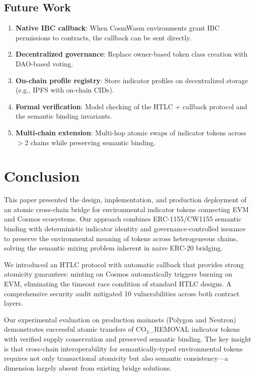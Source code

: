 \documentclass[conference,10pt]{IEEEtran}
\begin{document}
\subsection{Future Work}

\begin{enumerate}
    \item \textbf{Native IBC callback}: When CosmWasm environments grant IBC permissions to contracts, the callback can be sent directly.
    \item \textbf{Decentralized governance}: Replace owner-based token class creation with DAO-based voting.
    \item \textbf{On-chain profile registry}: Store indicator profiles on decentralized storage (e.g., IPFS with on-chain CIDs).
    \item \textbf{Formal verification}: Model checking of the HTLC + callback protocol and the semantic binding invariants.
    \item \textbf{Multi-chain extension}: Multi-hop atomic swaps of indicator tokens across $>$2 chains while preserving semantic binding.
\end{enumerate}

\section{Conclusion}
\label{sec:conclusion}

This paper presented the design, implementation, and production deployment of an atomic cross-chain bridge for environmental indicator tokens connecting EVM and Cosmos ecosystems. Our approach combines ERC-1155/CW1155 semantic binding with deterministic indicator identity and governance-controlled issuance to preserve the environmental meaning of tokens across heterogeneous chains, solving the semantic mixing problem inherent in naive ERC-20 bridging.

We introduced an HTLC protocol with automatic callback that provides strong atomicity guarantees: minting on Cosmos automatically triggers burning on EVM, eliminating the timeout race condition of standard HTLC designs. A comprehensive security audit mitigated 10 vulnerabilities across both contract layers.

Our experimental evaluation on production mainnets (Polygon and Neutron) demonstrates successful atomic transfers of CO$_2$\_REMOVAL indicator tokens with verified supply conservation and preserved semantic binding. The key insight is that cross-chain interoperability for semantically-typed environmental tokens requires not only transactional atomicity but also semantic consistency---a dimension largely absent from existing bridge solutions.
\end{document}
